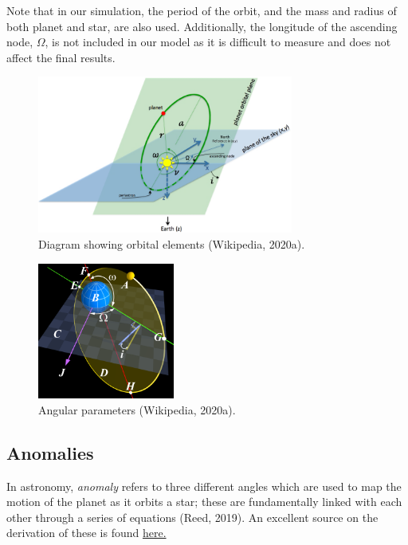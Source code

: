 \documentclass[11pt]{article}
\begin{document}
Note that in our simulation, the period of the orbit, and the mass and
radius of both planet and star, are also used. Additionally, the
longitude of the ascending node, \(\Omega\), is not included in our
model as it is difficult to measure and does not affect the final
results.

\quad

\begin{figure}[!ht]
	\centering 
	\includegraphics[width=0.75\textwidth]{../images/orbit_elements.png}
	\caption{Diagram showing orbital elements (Wikipedia, 2020a).} \label{Figure 2.a.i}
\end{figure}

\smallskip

\begin{figure}[H]
	\centering
	\includegraphics[width=0.4\textwidth]{../images/Angular_Parameters_of_Elliptical_Orbit.png}
	\caption{Angular parameters (Wikipedia, 2020a).} \label{Figure 2.a.ii}
\end{figure}

    \hypertarget{anomalies}{%
\subsection{Anomalies}\label{anomalies}}

In astronomy, \emph{anomaly} refers to three different angles which are used
to map the motion of the planet as it orbits a star; these are
fundamentally linked with each other through a series of equations (Reed,
2019). An excellent source on the derivation of these is found
\href{http://www.bogan.ca/orbits/kepler/e_anomly.html}{here.}
\end{document}
